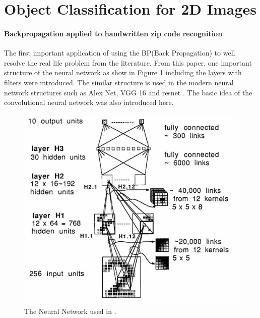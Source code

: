 \documentclass[a4paper,12pt]{article}
\begin{document}

\part{Object Classification for 2D Images}
\subsection{Backpropagation applied to handwritten zip code recognition\cite{doi:10.1162/neco.1989.1.4.541}}
The first important application of using the BP(Back Propagation) to well resolve the real life problem from the literature. From this paper, one important structure of the neural network as show in Figure \ref{fig:bpzip} including the layers with filters were introduced. The similar structure is used in the modern neural network structures such as Alex Net\cite{NIPS2012_4824}, VGG 16  \cite{SimonyanZ14a} and resnet \cite{DBLP:journals/corr/HeZRS15}. The basic idea of the convolutional neural network was also introduced here.\\

\begin{figure}[H]
  \begin{center}
      \includegraphics[scale=0.8]{bpzip.png}
\end{center}
\caption{The Neural Network used in \cite{doi:10.1162/neco.1989.1.4.541}.}
 \label{fig:bpzip}
 \end{figure}
 
\end{document}
